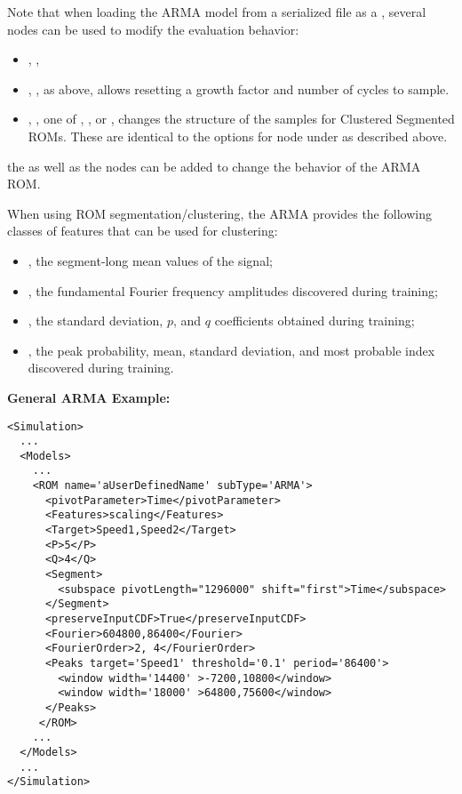 Note that when loading the ARMA model from a serialized file as a ,
several nodes can be used to modify the evaluation behavior:
\begin{itemize}
  \item {}, ,
  \item {}, , as  above, allows resetting
    a growth factor and number of cycles to sample.
  \item {}, , one of ,
    , or , changes the structure of the samples for Clustered
    Segmented ROMs. These are identical to the options for  node under 
    as described above.
\end{itemize}
the 
as well as the  nodes can be added to change the behavior of the ARMA ROM.

When using ROM segmentation/clustering, the ARMA provides the following classes of features that can
be used for clustering:
\begin{itemize}
   \item {}, the segment-long mean values of the signal;
   \item {}, the fundamental Fourier frequency amplitudes discovered during training;
   \item {}, the standard deviation, $p$, and $q$ coefficients obtained during training;
   \item {}, the peak probability, mean, standard deviation, and most probable index discovered during training.
\end{itemize}

\textbf{General ARMA Example:}
\begin{lstlisting}[style=XML,morekeywords={name,subType,pivotLength,shift,target,threshold,period,width}]
<Simulation>
  ...
  <Models>
    ...
    <ROM name='aUserDefinedName' subType='ARMA'>
      <pivotParameter>Time</pivotParameter>
      <Features>scaling</Features>
      <Target>Speed1,Speed2</Target>
      <P>5</P>
      <Q>4</Q>
      <Segment>
        <subspace pivotLength="1296000" shift="first">Time</subspace>
      </Segment>
      <preserveInputCDF>True</preserveInputCDF>
      <Fourier>604800,86400</Fourier>
      <FourierOrder>2, 4</FourierOrder>
      <Peaks target='Speed1' threshold='0.1' period='86400'>
        <window width='14400' >-7200,10800</window>
        <window width='18000' >64800,75600</window>
      </Peaks>
     </ROM>
    ...
  </Models>
  ...
</Simulation>
\end{lstlisting}

